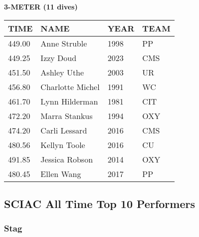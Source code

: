 \begin{table}[H]
\centering
\begin{minipage}[t]{0.6\textwidth}
\centering
\textbf{3-METER (11 dives)}\\[0.1cm]
\begin{tabular}{@{}p{1.8cm}p{2.8cm}p{1.2cm}p{1.4cm}@{}}
\hline
    \textbf{TIME} & \textbf{NAME} & \textbf{YEAR} & \textbf{TEAM} \\
\hline
    449.00 & Anne Struble & 1998 & PP \\
    449.25 & Izzy Doud & 2023 & CMS \\
    451.50 & Ashley Uthe & 2003 & UR \\
    456.80 & Charlotte Michel & 1991 & WC \\
    461.70 & Lynn Hilderman & 1981 & CIT \\
    472.20 & Marra Stankus & 1994 & OXY \\
    474.20 & Carli Lessard & 2016 & CMS \\
    480.56 & Kellyn Toole & 2016 & CU \\
    491.85 & Jessica Robson & 2014 & OXY \\
    480.45 & Ellen Wang & 2017 & PP \\
\hline
\end{tabular}
\end{minipage}
\end{table}


\newpage

\subsection{SCIAC All Time Top 10 Performers}
\subsubsection{Stag}

